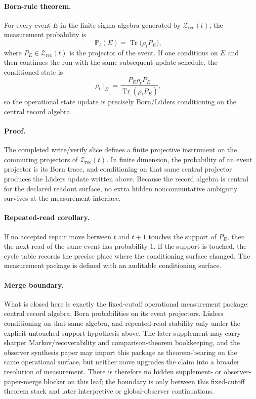 \documentclass[11pt]{article}
\begin{document}
\paragraph{Born-rule theorem.}
For every event $E$ in the finite sigma algebra generated by $\mathcal Z_{\mathrm{rec}}(t)$, the
measurement probability is
\begin{equation}
\mathbb P_t(E)=\operatorname{Tr}\!\bigl(\rho_t P_E\bigr),
\end{equation}
where $P_E\in\mathcal Z_{\mathrm{rec}}(t)$ is the projector of the event. If one conditions on
$E$ and then continues the run with the same subsequent update schedule, the conditioned state is
\begin{equation}
\rho_t\!\mid_E
=
\frac{P_E\rho_t P_E}{\operatorname{Tr}(\rho_t P_E)},
\end{equation}
so the operational state update is precisely Born/L\"uders conditioning on the central record
algebra.

\paragraph{Proof.}
The completed write/verify slice defines a finite projective instrument on the commuting
projectors of $\mathcal Z_{\mathrm{rec}}(t)$. In finite dimension, the probability of an event
projector is its Born trace, and conditioning on that same central projector produces the
L\"uders update written above. Because the record algebra is central for the declared readout
surface, no extra hidden noncommutative ambiguity survives at the measurement interface.

\paragraph{Repeated-read corollary.}
If no accepted repair move between $t$ and $t+1$ touches the support of $P_E$, then the next
read of the same event has probability $1$. If the support is touched, the cycle table records
the precise place where the conditioning surface changed. The measurement package is defined
with an auditable conditioning surface.

\paragraph{Merge boundary.}
What is closed here is exactly the fixed-cutoff operational measurement package: central record
algebra, Born probabilities on its event projectors, L\"uders conditioning on that same algebra,
and repeated-read stability only under the explicit untouched-support hypothesis above. The
later supplement may carry sharper Markov/recoverability and comparison-theorem bookkeeping, and
the observer synthesis paper may import this package as theorem-bearing on the same operational
surface, but neither move upgrades the claim into a broader resolution of
measurement. There is therefore no hidden supplement- or observer-paper-merge blocker on this
leaf; the boundary is only between this fixed-cutoff theorem stack and later interpretive or
global-observer continuations.
\end{document}

